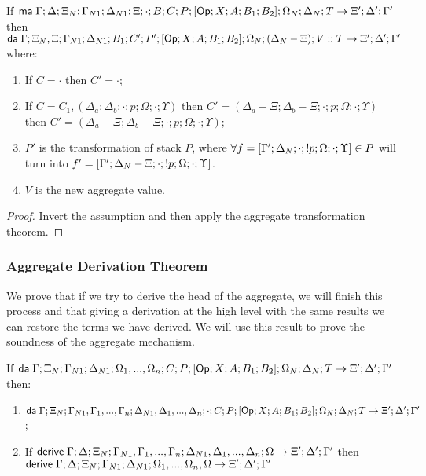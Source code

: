 \begin{lemma}
   If $\mathsf{ma} \; \Gamma; \Delta; \Xi_N; \Gamma_{N1}; \Delta_{N1}; \Xi; \cdot; B; C; P; [\mathsf{Op} ; X ; A ; B_1; B_2];\Omega_N; \Delta_N; T \rightarrow \Xi'; \Delta'; \Gamma'$ then \\
      $\mathsf{da} \; \Gamma; \Xi_N, \Xi; \Gamma_{N1}; \Delta_{N1}; B_1; C'; P'; [\mathsf{Op} ; X ; A ; B_1; B_2]; \Omega_N; (\Delta_N - \Xi); V :: T \rightarrow \Xi'; \Delta'; \Gamma'$ where:
   
   \begin{enumerate}
      \item If $C = \cdot$ then $C' = \cdot$;
      \item If $C = C_1, (\Delta_a; \Delta_b; \cdot; p; \Omega; \cdot; \Upsilon)$ then $C' = (\Delta_a - \Xi; \Delta_b - \Xi; \cdot; p; \Omega; \cdot; \Upsilon)$ then $C' = (\Delta_a - \Xi; \Delta_b - \Xi; \cdot; p; \Omega; \cdot; \Upsilon)$;
      \item $P'$ is the transformation of stack $P$, where $\forall f = [\Gamma'; \Delta_N; \cdot; {!} p; \Omega; \cdot; \Upsilon] \in P$ will turn into $f' = [\Gamma'; \Delta_N - \Xi; \cdot; {!} p; \Omega; \cdot; \Upsilon]$.
      \item $V$ is the new aggregate value.
   \end{enumerate}
\end{lemma}

\begin{proof}
   Invert the assumption and then apply the aggregate transformation theorem.
\end{proof}

\subsubsection{Aggregate Derivation Theorem}

We prove that if we try to derive the head of the aggregate, we will finish this process and that giving a derivation at the high level with the same results we can restore the terms we have derived. We will use this result to prove the soundness of the aggregate mechanism.

\begin{theorem}
   If $\mathsf{da} \; \Gamma; \Xi_N; \Gamma_{N1}; \Delta_{N1}; \Omega_1, ..., \Omega_n; C; P; [\mathsf{Op} ; X ; A ; B_1; B_2]; \Omega_N; \Delta_N; T \rightarrow \Xi'; \Delta'; \Gamma'$ then:
   
   \begin{enumerate}
      \item $\mathsf{da} \; \Gamma; \Xi_N; \Gamma_{N1}, \Gamma_1, ..., \Gamma_n; \Delta_{N1}, \Delta_1, ..., \Delta_n; \cdot; C; P; [\mathsf{Op} ; X ; A ; B_1; B_2]; \Omega_N; \Delta_N; T \rightarrow \Xi'; \Delta'; \Gamma'$;
      \item If $\mathsf{derive} \; \Gamma; \Delta; \Xi_N; \Gamma_{N1}, \Gamma_1, ..., \Gamma_n; \Delta_{N1}, \Delta_1, ..., \Delta_n; \Omega \rightarrow \Xi'; \Delta'; \Gamma'$ then $\mathsf{derive} \; \Gamma; \Delta; \Xi_N; \Gamma_{N1}; \Delta_{N1}; \Omega_1, ..., \Omega_n, \Omega \rightarrow \Xi'; \Delta'; \Gamma'$
   \end{enumerate}
\end{theorem}

